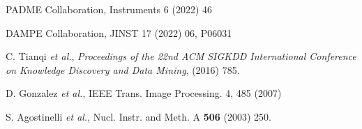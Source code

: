 \documentclass[12pt,times,draftclsnofoot,a4paper]{elsarticle}
\begin{document}
\begin{thebibliography}{99}
PADME Collaboration, Instruments 6 (2022) 46

DAMPE Collaboration, JINST 17 (2022) 06, P06031

C. Tianqi {\it et al.}, 
{\it Proceedings of the 22nd ACM SIGKDD International Conference on Knowledge Discovery and Data Mining},
(2016) 785.

D. Gonzalez {\it et al.}, IEEE Trans. Image Processing. 4, 485 (2007)

S. Agostinelli {\it et al.},  Nucl. Instr. and Meth. A {\bf 506} (2003) 250.


\end{thebibliography}
\end{document}

